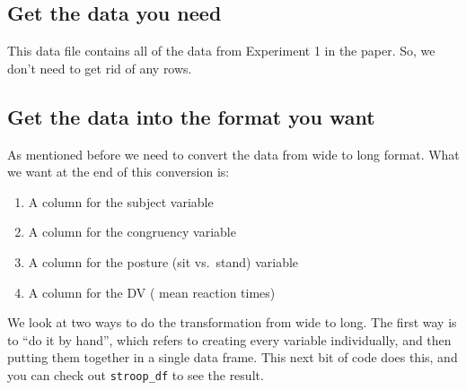 \documentclass[
]{book}
\providecommand{\tightlist}{%
  \setlength{\itemsep}{0pt}\setlength{\parskip}{0pt}}
\begin{document}
\hypertarget{get-the-data-you-need-2}{%
\subsection{Get the data you need}\label{get-the-data-you-need-2}}

This data file contains all of the data from Experiment 1 in the paper. So, we don't need to get rid of any rows.

\hypertarget{get-the-data-into-the-format-you-want}{%
\subsection{Get the data into the format you want}\label{get-the-data-into-the-format-you-want}}

As mentioned before we need to convert the data from wide to long format. What we want at the end of this conversion is:

\begin{enumerate}
\def\labelenumi{\arabic{enumi}.}
\tightlist
\item
  A column for the subject variable
\item
  A column for the congruency variable
\item
  A column for the posture (sit vs.~stand) variable
\item
  A column for the DV ( mean reaction times)
\end{enumerate}

We look at two ways to do the transformation from wide to long. The first way is to ``do it by hand'', which refers to creating every variable individually, and then putting them together in a single data frame. This next bit of code does this, and you can check out \texttt{stroop\_df} to see the result.
\end{document}
